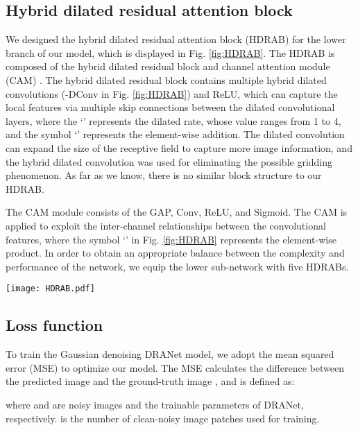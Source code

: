 \documentclass[3p,times]{elsarticle}
\begin{document}
\subsection{Hybrid dilated residual attention block}
We designed the hybrid dilated residual attention block (HDRAB) for the lower branch of our model, which is displayed in Fig. \ref{fig:HDRAB}. The HDRAB is composed of the hybrid dilated residual block and channel attention module (CAM) \cite{Hu2018}. The hybrid dilated residual block contains multiple hybrid dilated convolutions (-DConv in Fig. \ref{fig:HDRAB}) \cite{Yu2015} and ReLU, which can capture the local features via multiple skip connections between the dilated convolutional layers, where the `' represents the dilated rate, whose value ranges from 1 to 4, and the symbol `' represents the element-wise addition. The dilated convolution can expand the size of the receptive field to capture more image information, and the hybrid dilated convolution \cite{Wang2018} was used for eliminating the possible gridding phenomenon. As far as we know, there is no similar block structure to our HDRAB.

The CAM module consists of the GAP, Conv, ReLU, and Sigmoid. The CAM is applied to exploit the inter-channel relationships between the convolutional features, where the symbol `' in Fig. \ref{fig:HDRAB} represents the element-wise product. In order to obtain an appropriate balance between the complexity and performance of the network, we equip the lower sub-network with five HDRABs.

\begin{figure*}[htbp]
	\begin{center}
		\texttt{[image: HDRAB.pdf]}
		\caption{The architecture of the hybrid dilated residual attention block (HDRAB).}
		\label{fig:HDRAB}
	\end{center}
\end{figure*}

\subsection{Loss function}
To train the Gaussian denoising DRANet model, we adopt the mean squared error (MSE) to optimize our model. The MSE calculates the difference between the predicted image  and the ground-truth image , and is defined as:

\noindent where  and  are noisy images and the trainable parameters of DRANet, respectively.  is the number of clean-noisy image patches used for training.
\end{document}
